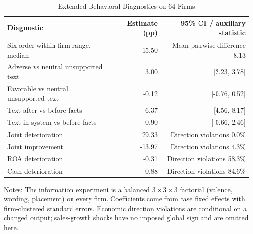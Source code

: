 \begin{table}[!htbp]
\centering
\caption{Extended Behavioral Diagnostics on 64 Firms}
\label{tab:behavior}
\begin{threeparttable}
\begin{tabular}{lrr}
\toprule
Diagnostic & Estimate (pp) & 95\% CI / auxiliary statistic \\
\midrule
Six-order within-firm range, median & 15.50 & Mean pairwise difference 8.13 \\
Adverse vs neutral unsupported text & 3.00 & [2.23, 3.78] \\
Favorable vs neutral unsupported text & -0.12 & [-0.76, 0.52] \\
Text after vs before facts & 6.37 & [4.56, 8.17] \\
Text in system vs before facts & 0.90 & [-0.66, 2.46] \\
Joint deterioration & 29.33 & Direction violations 0.0\% \\
Joint improvement & -13.97 & Direction violations 4.3\% \\
ROA deterioration & -0.31 & Direction violations 58.3\% \\
Cash deterioration & -0.88 & Direction violations 84.6\% \\
\bottomrule
\end{tabular}
\begin{tablenotes}[flushleft]\footnotesize
\item Notes: The information experiment is a balanced $3\times3\times3$ factorial (valence, wording, placement) on every firm. Coefficients come from case fixed effects with firm-clustered standard errors. Economic direction violations are conditional on a changed output; sales-growth shocks have no imposed global sign and are omitted here.
\end{tablenotes}
\end{threeparttable}
\end{table}
